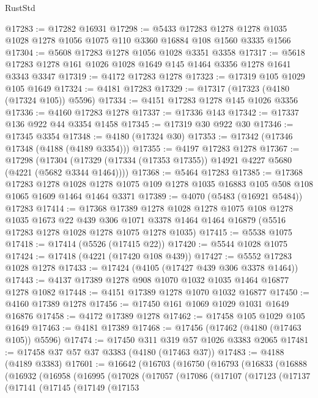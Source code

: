 \begin{lexlean}{RustStd}
\begin{coremodule}
@17283 := @17282 @16931
@17298 := @5433
    @17283
    @1278
    @1278
    @1035
    @1028
    @1278
    @1056
    @1075
    @110
    @3360
    @16884
    @108
    @1560
    @3335
    @1566
@17304 := @5608 @17283 @1278 @1056 @1028 @3351 @3358
@17317 := @5618 @17283 @1278 @161 @1026 @1028 @1649 @145 @1464 @3356 @1278 @1641 @3343 @3347
@17319 := @4172 @17283 @1278
@17323 := @17319 @105 @1029 @105 @1649
@17324 := @4181 @17283
@17329 := @17317 (@17323 (@4180 (@17324 @105)) @5596)
@17334 := @4151 @17283 @1278 @145 @1026 @3356
@17336 := @4160 @17283 @1278
@17337 := @17336 @143
@17342 := @17337 @136 @922 @44 @3354 @1458
@17345 := @17319 @30 @922 @30
@17346 := @17345 @3354
@17348 := @4180 (@17324 @30)
@17353 := @17342 (@17346 @17348 (@4188 (@4189 @3354)))
@17355 := @4197 @17283 @1278
@17367 := @17298
    (@17304 (@17329 (@17334 (@17353 @17355)) @14921 @4227 @5680 (@4221 (@5682 @3344 @1464))))
@17368 := @5464 @17283
@17385 := @17368
    @17283
    @1278
    @1028
    @1278
    @1075
    @109
    @1278
    @1035
    @16883
    @105
    @508
    @108
    @1065
    @1609
    @1464
    @1464
    @3371
@17389 := @4070 (@5483 (@16921 @5484)) @17283
@17414 := @17368
    @17389
    @1278
    @1028
    @1278
    @1075
    @108
    @1278
    @1035
    @1673
    @22
    @439
    @306
    @1071
    @3378
    @1464
    @1464
    @16879
    (@5516 @17283 @1278 @1028 @1278 @1075 @1278 @1035)
@17415 := @5538 @1075
@17418 := @17414 (@5526 (@17415 @22))
@17420 := @5544 @1028 @1075
@17424 := @17418 (@4221 (@17420 @108 @439))
@17427 := @5552 @17283 @1028 @1278
@17433 := @17424 (@4105 (@17427 @439 @306 @3378 @1464))
@17443 := @4137 @17389 @1278 @908 @1070 @1032 @1035 @1464 @16877 @1278 @1082
@17448 := @4151 @17389 @1278 @1070 @1032 @16877
@17450 := @4160 @17389 @1278
@17456 := @17450 @161 @1069 @1029 @1031 @1649 @16876
@17458 := @4172 @17389 @1278
@17462 := @17458 @105 @1029 @105 @1649
@17463 := @4181 @17389
@17468 := @17456 (@17462 (@4180 (@17463 @105)) @5596)
@17474 := @17450 @311 @319 @57 @1026 @3383 @2065
@17481 := @17458 @37 @57 @37 @3383 (@4180 (@17463 @37))
@17483 := @4188 (@4189 @3383)
@17601 := @16642
    (@16703
      (@16750
        (@16793
          (@16833
            (@16888
              (@16932
                (@16958
                  (@16995
                    (@17028
                      (@17057
                        (@17086
                          (@17107
                            (@17123
                              (@17137
                                (@17141
                                  (@17145
                                    (@17149
                                      (@17153

\end{coremodule}
\end{lexlean}

